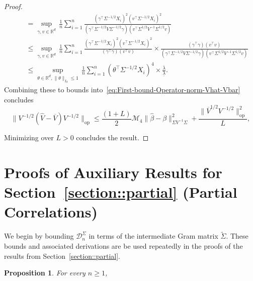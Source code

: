 \documentclass{article}
\newtheorem{proposition}{Proposition}
\begin{document}
\begin{appendices}
\begin{proof}
\begin{align*}
 &\quad= \sup_{\gamma, v\in\mathbb{R}^d}\,\frac{1}{n}\sum_{i=1}^n \frac{(\gamma^{\top}\Sigma^{-1/2}X_i)^2(v^{\top}\Sigma^{-1/2}X_i)^2}{(\gamma^{\top}\Sigma^{-1/2}V\Sigma^{-1/2}\gamma)(v^{\top}\Sigma^{1/2}V^{-1}\Sigma^{1/2}v)}\\
 &\quad\le \sup_{\gamma, v\in\mathbb{R}^d}\,\frac{1}{n}\sum_{i=1}^n \frac{(\gamma^{\top}\Sigma^{-1/2}X_i)^2(v^{\top}\Sigma^{-1/2}X_i)^2}{(\gamma^{\top}\gamma)(v^{\top}v)}\times\frac{(\gamma^{\top}\gamma)(v^{\top}v)}{(\gamma^{\top}\Sigma^{-1/2}V\Sigma^{-1/2}\gamma)(v^{\top}\Sigma^{1/2}V^{-1}\Sigma^{1/2}v)}\\
 &\quad\le \sup_{\theta\in\mathbb{R}^d,\|\theta\|_{I_d} \le 1}\,\frac{1}{n}\sum_{i=1}^n (\theta^{\top}\Sigma^{-1/2}X_i)^4\times\frac{\overline{\lambda}}{\underline{\lambda}}.
 \end{align*}
 Combining these to bounds into~\eqref{eq:First-bound-Operator-norm-Vhat-Vbar} concludes
 \begin{equation}\label{eq:First-bound-Operator-norm-Vhat-Vbar}
 \|V^{-1/2}(\widehat{V} - \overline{V})V^{-1/2}\|_{\mathrm{op}} \le \frac{(1 + L)}{2}\mathcal{M}_4\|\widehat{\beta} - \beta\|_{\Sigma V^{-1}\Sigma}^2 + \frac{\|\overline{V}^{1/2}V^{-1/2}\|_{\mathrm{op}}^2}{L},
 \end{equation}
 
 
 
 
 
 
 
 
 
 Minimizing over $L > 0$ concludes the result.
 \end{proof}
 
 
 
 
 
 
 
 
 \section{Proofs of Auxiliary Results for Section~\ref{section::partial} (Partial Correlations)}
 \label{appendix:auxiliary.partial}
 We begin by bounding $\mathcal{D}_n^{\Sigma}$ in terms of the intermediate Gram matrix $\widetilde{\Sigma}$. These bounds and associated derivations are be used repeatedly in the proofs of the results from Section~\ref{section::partial}.
 
 \begin{proposition}\label{prop:bounding-D-sigma}
 For every $n\ge1$,
 \
 \end{proposition}
 

\end{appendices}
\end{document}
